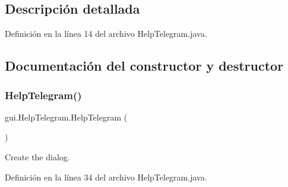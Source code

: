 \subsection{Descripción detallada}


Definición en la línea 14 del archivo Help\+Telegram.\+java.



\subsection{Documentación del constructor y destructor}
\mbox{\label{classgui_1_1_help_telegram_a74bf844c45b4063a5c7d4956b13af89c}} 
\subsubsection{\texorpdfstring{HelpTelegram()}{HelpTelegram()}}
{\footnotesize\ttfamily gui.\+Help\+Telegram.\+Help\+Telegram (\begin{DoxyParamCaption}{ }\end{DoxyParamCaption})}



Create the dialog. 



Definición en la línea 34 del archivo Help\+Telegram.\+java.



